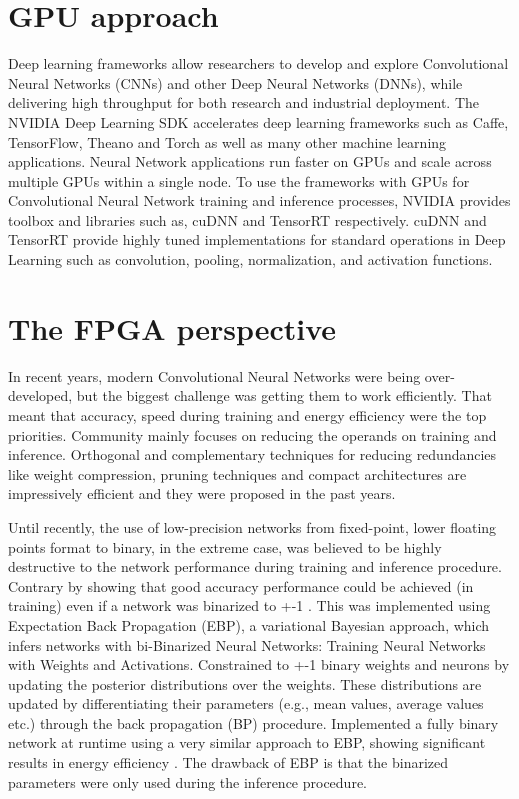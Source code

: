 \section{GPU approach}
Deep learning frameworks allow researchers to develop and explore Convolutional Neural Networks (CNNs) and other Deep Neural Networks (DNNs), while delivering high throughput for both research and industrial deployment. The NVIDIA Deep Learning SDK accelerates deep learning frameworks such as Caffe, TensorFlow, Theano and Torch as well as many other machine learning applications. Neural Network applications run faster on GPUs and scale across multiple GPUs within a single node. To use the frameworks with GPUs for Convolutional Neural Network training and inference processes, NVIDIA provides toolbox and libraries such as, cuDNN and TensorRT respectively. cuDNN and TensorRT provide highly tuned implementations for standard operations in Deep Learning such as convolution, pooling, normalization, and activation functions.


\section{The FPGA perspective}
In recent years, modern Convolutional Neural Networks were being over-developed, but the biggest challenge was getting them to work efficiently. That meant that accuracy, speed during training and energy efficiency were the top priorities. Community mainly focuses on reducing the operands on training and inference. Orthogonal and complementary techniques for reducing redundancies like weight compression, pruning techniques \cite{Reference4} and compact architectures \cite{Reference5} are impressively efficient and they were proposed in the past years.


Until recently, the use of low-precision networks from fixed-point, lower floating points format to binary, in the extreme case, was believed to be highly destructive to the network performance \cite{Reference6} during training and inference procedure. Contrary by showing that good accuracy performance could be achieved (in training) even if a network was binarized to +-1 \cite{Reference7}. This was implemented using Expectation Back Propagation (EBP), a variational Bayesian approach, which infers networks with bi-Binarized Neural Networks: Training Neural Networks with Weights and Activations. Constrained to +-1 binary weights and neurons by updating the posterior distributions over the weights.  These distributions are updated by differentiating their parameters (e.g., mean values, average values etc.) through the back propagation (BP) procedure. Implemented a fully binary network at runtime using a very similar approach to EBP, showing significant results in energy efficiency \cite{Reference8}. The drawback of EBP is that the binarized parameters were only used during the inference procedure.

